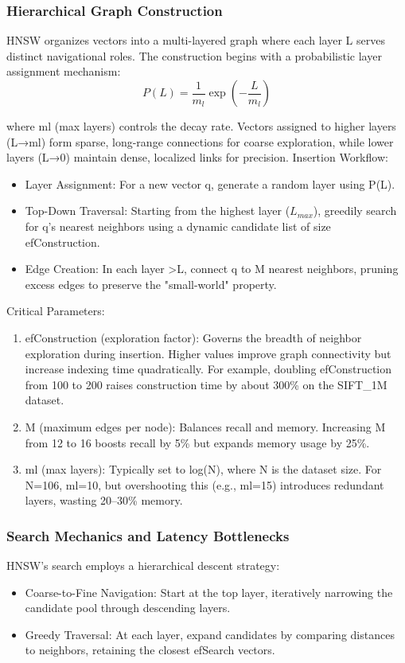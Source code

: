 \documentclass[sigconf, nonacm]{acmart}
\begin{document}
\subsubsection{Hierarchical Graph Construction}
HNSW organizes vectors into a multi-layered graph where each layer L serves distinct navigational roles. The construction begins with a probabilistic layer assignment mechanism:
\begin{displaymath}
P(L) = \frac{1}{m_l} \exp\left(-\frac{L}{m_l}\right)
\end{displaymath}

where ml (max layers) controls the decay rate. Vectors assigned to higher layers (L→ml) form sparse, long-range connections for coarse exploration, while lower layers (L→0) maintain dense, localized links for precision.
Insertion Workflow:
\begin{itemize}
    \item Layer Assignment: For a new vector q, generate a random layer using P(L).
    \item Top-Down Traversal: Starting from the highest layer ($L_{max}$), greedily search for q's nearest neighbors using a dynamic candidate list of size efConstruction.
    \item Edge Creation: In each layer >L, connect q to M nearest neighbors, pruning excess edges to preserve the "small-world" property.

\end{itemize}

Critical Parameters:
\begin{enumerate}
    \item efConstruction (exploration factor): Governs the breadth of neighbor exploration during insertion. Higher values improve graph connectivity but increase indexing time quadratically. For example, doubling efConstruction from 100 to 200 raises construction time by about 300\% on the SIFT\_1M dataset.
    \item M (maximum edges per node): Balances recall and memory. Increasing M from 12 to 16 boosts recall by 5\% but expands memory usage by 25\%.
    \item ml (max layers): Typically set to log(N), where N is the dataset size. For N=106, ml=10, but overshooting this (e.g., ml=15) introduces redundant layers, wasting 20–30\% memory.
\end{enumerate}
\subsubsection{Search Mechanics and Latency Bottlenecks}
HNSW’s search employs a hierarchical descent strategy:
\begin{itemize}
    \item Coarse-to-Fine Navigation: Start at the top layer, iteratively narrowing the candidate pool through descending layers.
    \item Greedy Traversal: At each layer, expand candidates by comparing distances to neighbors, retaining the closest efSearch vectors.
\end{itemize}
\end{document}
